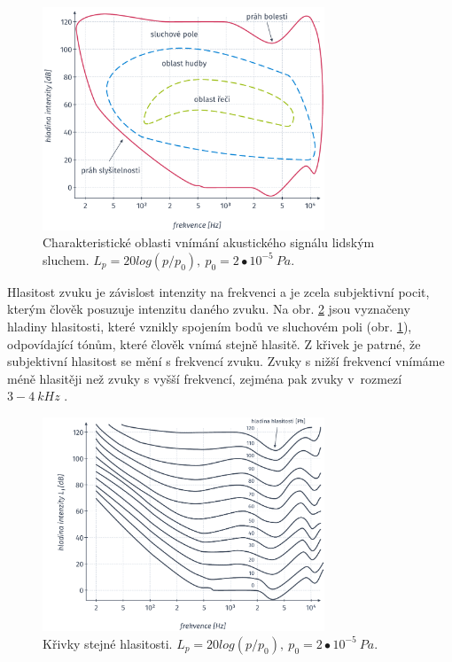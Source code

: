 \begin{figure}[hbpt]
  \centering
  \includegraphics[width=0.75\textwidth]{./ch4-asr/img/listening_perception.pdf}
  \caption[Charakteristické oblasti vnímání akustického signálu.]{Charakteristické oblasti vnímání akustického signálu lidským sluchem. $L_p = 20log(p/p_0),\ p_0 = 2\bullet10^{-5}\ Pa$.}
  \label{fig:asr:mfcc:acoustic:characteristic}
\end{figure}

Hlasitost zvuku je závislost intenzity na frekvenci a je zcela subjektivní pocit, kterým člověk posuzuje intenzitu daného zvuku. Na obr. \ref{fig:asr:mfcc:acoustic:levels} jsou vyznačeny hladiny hlasitosti, které vznikly spojením bodů ve sluchovém poli (obr. \ref{fig:asr:mfcc:acoustic:characteristic}), odpovídající tónům, které člověk vnímá stejně hlasitě. Z křivek je patrné, že subjektivní hlasitost se mění s frekvencí zvuku. Zvuky s nižší frekvencí vnímáme méně hlasitěji než zvuky s vyšší frekvencí, zejména pak zvuky v~rozmezí $3 - 4\ kHz$ \cite{Psutka2006}.

\begin{figure}[hbpt]
  \centering
  \includegraphics[width=0.75\textwidth]{./ch4-asr/img/listening_levels.pdf}
  \caption[Křívky stejné hlasitosti.]{Křivky stejné hlasitosti. $L_p = 20log(p/p_0),\ p_0 = 2\bullet10^{-5}\ Pa$.}
  \label{fig:asr:mfcc:acoustic:levels}
\end{figure}

